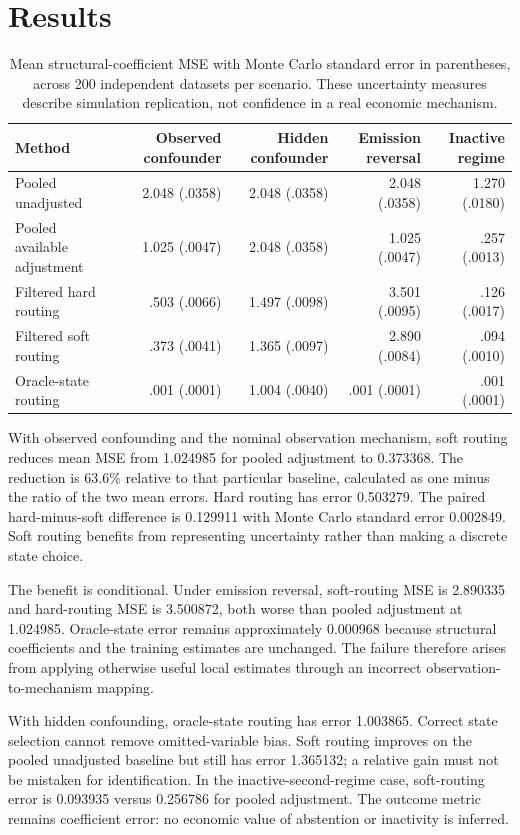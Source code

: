 \section{Results}
\begin{table}[t]
\centering
\caption{Mean structural-coefficient MSE with Monte Carlo standard error in parentheses, across 200 independent datasets per scenario. These uncertainty measures describe simulation replication, not confidence in a real economic mechanism.}
\setlength{\tabcolsep}{4pt}
\begin{tabular}{lrrrr}\toprule
Method & Observed confounder & Hidden confounder & Emission reversal & Inactive regime\\\midrule
Pooled unadjusted & 2.048 (.0358) & 2.048 (.0358) & 2.048 (.0358) & 1.270 (.0180)\\
Pooled available adjustment & 1.025 (.0047) & 2.048 (.0358) & 1.025 (.0047) & .257 (.0013)\\
Filtered hard routing & .503 (.0066) & 1.497 (.0098) & 3.501 (.0095) & .126 (.0017)\\
Filtered soft routing & .373 (.0041) & 1.365 (.0097) & 2.890 (.0084) & .094 (.0010)\\
Oracle-state routing & .001 (.0001) & 1.004 (.0040) & .001 (.0001) & .001 (.0001)\\\bottomrule
\end{tabular}\label{tab:cmtf}
\end{table}

With observed confounding and the nominal observation mechanism, soft routing reduces mean MSE from 1.024985 for pooled adjustment to 0.373368. The reduction is 63.6\% relative to that particular baseline, calculated as one minus the ratio of the two mean errors. Hard routing has error 0.503279. The paired hard-minus-soft difference is 0.129911 with Monte Carlo standard error 0.002849. Soft routing benefits from representing uncertainty rather than making a discrete state choice.

The benefit is conditional. Under emission reversal, soft-routing MSE is 2.890335 and hard-routing MSE is 3.500872, both worse than pooled adjustment at 1.024985. Oracle-state error remains approximately 0.000968 because structural coefficients and the training estimates are unchanged. The failure therefore arises from applying otherwise useful local estimates through an incorrect observation-to-mechanism mapping.

With hidden confounding, oracle-state routing has error 1.003865. Correct state selection cannot remove omitted-variable bias. Soft routing improves on the pooled unadjusted baseline but still has error 1.365132; a relative gain must not be mistaken for identification. In the inactive-second-regime case, soft-routing error is 0.093935 versus 0.256786 for pooled adjustment. The outcome metric remains coefficient error: no economic value of abstention or inactivity is inferred.


